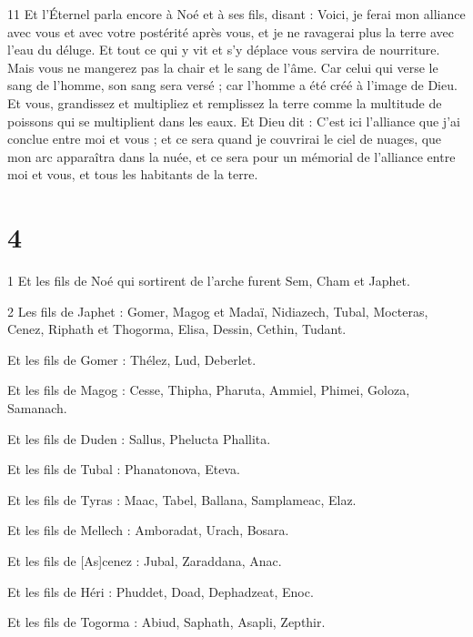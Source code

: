 \par 11 Et l'Éternel parla encore à Noé et à ses fils, disant : Voici, je ferai mon alliance avec vous et avec votre postérité après vous, et je ne ravagerai plus la terre avec l'eau du déluge. Et tout ce qui y vit et s'y déplace vous servira de nourriture. Mais vous ne mangerez pas la chair et le sang de l'âme. Car celui qui verse le sang de l’homme, son sang sera versé ; car l’homme a été créé à l’image de Dieu. Et vous, grandissez et multipliez et remplissez la terre comme la multitude de poissons qui se multiplient dans les eaux. Et Dieu dit : C'est ici l'alliance que j'ai conclue entre moi et vous ; et ce sera quand je couvrirai le ciel de nuages, que mon arc apparaîtra dans la nuée, et ce sera pour un mémorial de l'alliance entre moi et vous, et tous les habitants de la terre.

\chapter{4}

\par 1 Et les fils de Noé qui sortirent de l'arche furent Sem, Cham et Japhet.

\par 2 Les fils de Japhet : Gomer, Magog et Madaï, Nidiazech, Tubal, Mocteras, Cenez, Riphath et Thogorma, Elisa, Dessin, Cethin, Tudant.

\par Et les fils de Gomer : Thélez, Lud, Deberlet.

\par Et les fils de Magog : Cesse, Thipha, Pharuta, Ammiel, Phimei, Goloza, Samanach.

\par Et les fils de Duden : Sallus, Phelucta Phallita.

\par Et les fils de Tubal : Phanatonova, Eteva.

\par Et les fils de Tyras : Maac, Tabel, Ballana, Samplameac, Elaz.

\par Et les fils de Mellech : Amboradat, Urach, Bosara.

\par Et les fils de [As]cenez : Jubal, Zaraddana, Anac.

\par Et les fils de Héri : Phuddet, Doad, Dephadzeat, Enoc.

\par Et les fils de Togorma : Abiud, Saphath, Asapli, Zepthir.


